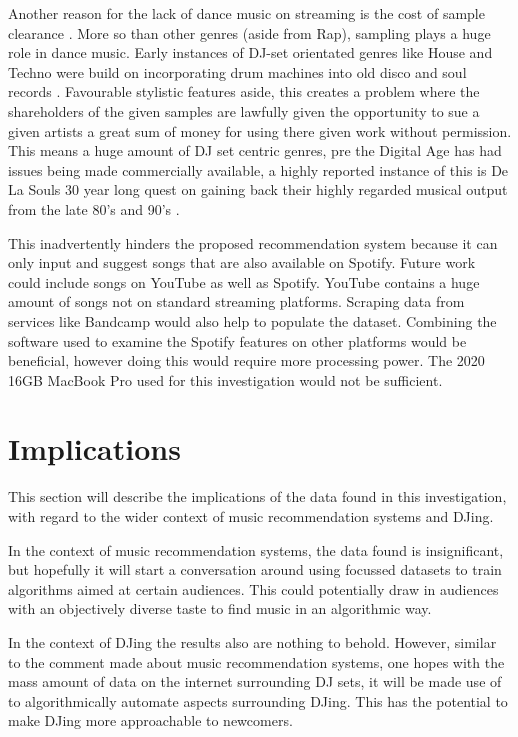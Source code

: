 Another reason for the lack of dance music on streaming is the cost of sample clearance \citep{morey_copyright_2013}. More so than other genres (aside from Rap), sampling plays a huge role in dance music. Early instances of DJ-set orientated genres like House and Techno were build on incorporating drum machines into old disco and soul records \citep{reynolds_energy_2013}. Favourable stylistic features aside, this creates a problem where the shareholders of the given samples are lawfully given the opportunity to sue a given artists a great sum of money for using there given work without permission. This means a huge amount of DJ set centric genres, pre the Digital Age has had issues being made commercially available, a highly reported instance of this is De La Souls 30 year long quest on gaining back their highly regarded musical output from the late 80's and 90's \citep{saunders_soul_2023}.

This inadvertently hinders the proposed recommendation system because it can only input and suggest songs that are also available on Spotify. Future work could include songs on YouTube as well as Spotify. YouTube contains a huge amount of songs not on standard streaming platforms. Scraping data from services like Bandcamp would also help to populate the dataset. Combining the software used to examine the Spotify features on other platforms would be beneficial, however doing this would require more processing power. The 2020 16GB MacBook Pro used for this investigation would not be sufficient.



\section{Implications}
This section will describe the implications of the data found in this investigation, with regard to the
wider context of music recommendation systems and DJing.

In the context of music recommendation systems, the data found is insignificant, but hopefully it will start a conversation around using focussed datasets to train algorithms aimed at certain audiences. This could potentially draw in audiences with an objectively diverse taste to find music in an algorithmic way.

In the context of DJing the results also are nothing to behold. However, similar to the comment made about music recommendation systems, one hopes with the mass amount of data on the internet surrounding DJ sets, it will be made use of to algorithmically automate aspects surrounding DJing. This has the potential to make DJing more approachable to newcomers. 



